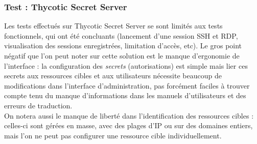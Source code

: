 \subsubsection{Test : Thycotic Secret Server}
\label{par:testss}

Les tests effectués sur Thycotic Secret Server se sont limités aux tests fonctionnels, qui ont été concluants (lancement d'une session SSH et RDP, visualisation des sessions enregistrées, limitation d'accès, etc). Le gros point négatif que l'on peut noter sur cette solution est le manque d'ergonomie de l'interface : la configuration des \emph{secrets} (autorisations) est simple mais lier ces secrets aux ressources cibles et aux utilisateurs nécessite beaucoup de modifications dans l'interface d'administration, pas forcément faciles à trouver compte tenu du manque d'informations dans les manuels d'utilisateurs et des erreurs de traduction.\\
On notera aussi le manque de liberté dans l'identification des ressources cibles : celles-ci sont gérées en masse, avec des plages d'IP ou sur des domaines entiers, mais l'on ne peut pas configurer une ressource cible individuellement.